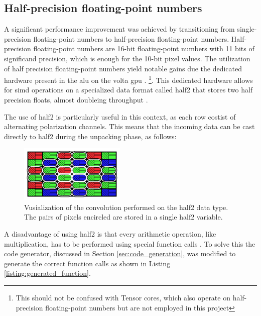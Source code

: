 \subsection{Half-precision floating-point numbers}
\label{sec:half2}
A significant performance improvement was achieved by transitioning from single-precision floating-point numbers to half-precision floating-point numbers.
Half-precision floating-point numbers are 16-bit floating-point numbers with 11 bits of significand precision, which is enough for the 10-bit pixel values.
The utilization of half precision floating-point numbers yield notable gains due the dedicated hardware present in the \gls{alu} on the \gls{volta} \gls{gpu} \cite{CUDA2023}.
\footnote{This should not be confused with Tensor cores, which also operate on half-precision floating-point numbers but are not employed in this project}.
This dedicated hardware allows for \gls{simd} operations on a specialized data format called \gls{half2} that stores two half precision floats, almost doubleing throughput \cite{nvidiaHalf2ArithmeticFunctions2023}\cite{hoExploitingHalfPrecision2017}.

The use of \gls{half2} is particularly useful in this context, as each row costist of alternating polarization channels.
This means that the incoming data can be cast directly to \gls{half2} during the unpacking phase, as follows:



\begin{figure}[H]
    \centering
    \includegraphics[width=0.45\textwidth]{figures/polarized_image/half2_conv.pdf}
    \caption{Vusialization of the convolution performed on the \gls{half2} data type. The pairs of pixels encircled are stored in a single \gls{half2} variable.}
    \label{fig:half2_conv}
\end{figure}

A disadvantage of using \gls{half2} is that every arithmetic operation, like multiplication, has to be performed using spceial function calls \cite{nvidiaHalf2ArithmeticFunctions2023}.
To solve this the code generator, discussed in Section \ref{sec:code_generation}, was modified to generate the correct function calls as shown in Listing \ref{listing:generated_function}.

